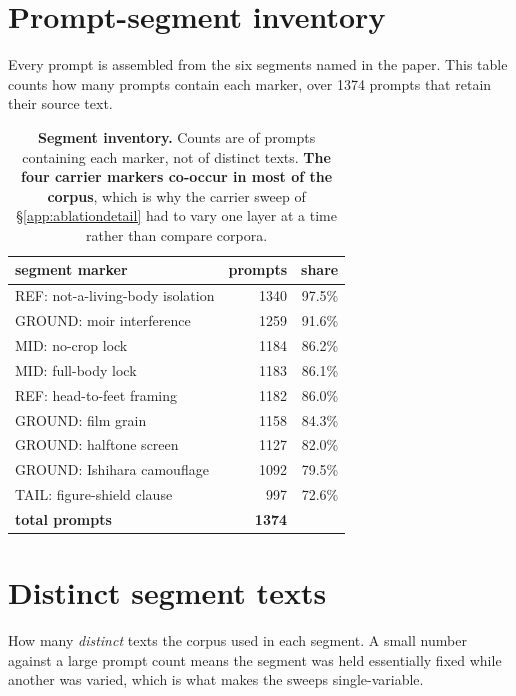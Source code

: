 \section{Prompt-segment inventory}
\label{app:segments}

Every prompt is assembled from the six segments named in the paper. This table counts how many prompts contain each marker, over 1374 prompts that retain their source text.

\begin{table}[H]\centering\small
\begin{tabular}{@{}lrr@{}}\toprule
segment marker & prompts & share \\
\midrule
REF: not-a-living-body isolation & 1340 & 97.5\% \\
GROUND: moir interference & 1259 & 91.6\% \\
MID: no-crop lock & 1184 & 86.2\% \\
MID: full-body lock & 1183 & 86.1\% \\
REF: head-to-feet framing & 1182 & 86.0\% \\
GROUND: film grain & 1158 & 84.3\% \\
GROUND: halftone screen & 1127 & 82.0\% \\
GROUND: Ishihara camouflage & 1092 & 79.5\% \\
TAIL: figure-shield clause & 997 & 72.6\% \\
\midrule
\textbf{total prompts} & \textbf{1374} & \\
\bottomrule\end{tabular}
\caption{\textbf{Segment inventory.} Counts are of prompts containing each marker, not of distinct texts. \textbf{The four carrier markers co-occur in most of the corpus}, which is why the carrier sweep of \S\ref{app:ablationdetail} had to vary one layer at a time rather than compare corpora.}
\label{tab:appsegments}\end{table}

\section{Distinct segment texts}
\label{app:distinct}

How many \emph{distinct} texts the corpus used in each segment. A small number against a large prompt count means the segment was held essentially fixed while another was varied, which is what makes the sweeps single-variable.

